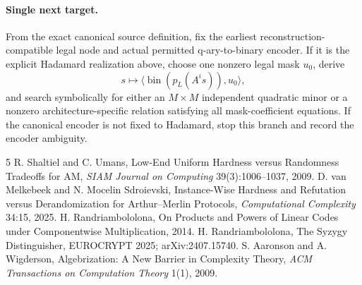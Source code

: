 \documentclass[11pt]{article}
\begin{document}
\paragraph{Single next target.}
From the exact canonical source definition, fix the earliest reconstruction-compatible legal node and actual permitted q-ary-to-binary encoder. If it is the explicit Hadamard realization above, choose one nonzero legal mask $u_0$, derive
\[
s\mapsto\langle\operatorname{bin}(p_L(A^is)),u_0\rangle,
\]
and search symbolically for either an $M\times M$ independent quadratic minor or a nonzero architecture-specific relation satisfying all mask-coefficient equations. If the canonical encoder is not fixed to Hadamard, stop this branch and record the encoder ambiguity.

\begin{thebibliography}{5}
 R. Shaltiel and C. Umans, Low-End Uniform Hardness versus Randomness Tradeoffs for AM, \emph{SIAM Journal on Computing} 39(3):1006--1037, 2009.
 D. van Melkebeek and N. Mocelin Sdroievski, Instance-Wise Hardness and Refutation versus Derandomization for Arthur--Merlin Protocols, \emph{Computational Complexity} 34:15, 2025.
 H. Randriambololona, On Products and Powers of Linear Codes under Componentwise Multiplication, 2014.
 H. Randriambololona, The Syzygy Distinguisher, EUROCRYPT 2025; arXiv:2407.15740.
 S. Aaronson and A. Wigderson, Algebrization: A New Barrier in Complexity Theory, \emph{ACM Transactions on Computation Theory} 1(1), 2009.
\end{thebibliography}
\end{document}
